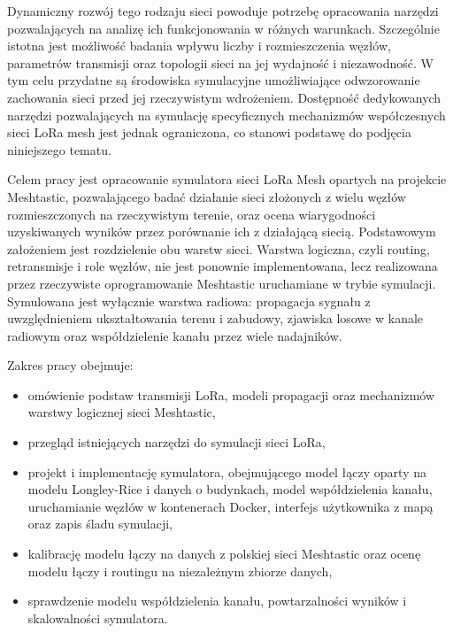 \documentclass[12pt,a4paper,twoside]{report}
\theoremstyle{definition} %
\begin{document}
Dynamiczny rozwój tego rodzaju sieci powoduje potrzebę opracowania narzędzi pozwalających na analizę ich funkcjonowania w różnych warunkach. Szczególnie istotna jest możliwość badania wpływu liczby i rozmieszczenia węzłów, parametrów transmisji oraz topologii sieci na jej wydajność i niezawodność. W tym celu przydatne są środowiska symulacyjne umożliwiające odwzorowanie zachowania sieci przed jej rzeczywistym wdrożeniem. Dostępność dedykowanych narzędzi pozwalających na symulację specyficznych mechanizmów współczesnych sieci LoRa mesh jest jednak ograniczona, co stanowi podstawę do podjęcia niniejszego tematu.

Celem pracy jest opracowanie symulatora sieci LoRa Mesh opartych na projekcie Meshtastic, pozwalającego badać działanie sieci złożonych z wielu węzłów rozmieszczonych na rzeczywistym terenie, oraz ocena wiarygodności uzyskiwanych wyników przez porównanie ich z działającą siecią. Podstawowym założeniem jest rozdzielenie obu warstw sieci. Warstwa logiczna, czyli routing, retransmisje i role węzłów, nie jest ponownie implementowana, lecz realizowana przez rzeczywiste oprogramowanie Meshtastic uruchamiane w trybie symulacji. Symulowana jest wyłącznie warstwa radiowa: propagacja sygnału z uwzględnieniem ukształtowania terenu i zabudowy, zjawiska losowe w kanale radiowym oraz współdzielenie kanału przez wiele nadajników.

Zakres pracy obejmuje:
\begin{itemize}
\item omówienie podstaw transmisji LoRa, modeli propagacji oraz mechanizmów warstwy logicznej sieci Meshtastic,
\item przegląd istniejących narzędzi do symulacji sieci LoRa,
\item projekt i implementację symulatora, obejmującego model łączy oparty na modelu Longley-Rice i danych o budynkach, model współdzielenia kanału, uruchamianie węzłów w kontenerach Docker, interfejs użytkownika z mapą oraz zapis śladu symulacji,
\item kalibrację modelu łączy na danych z polskiej sieci Meshtastic oraz ocenę modelu łączy i routingu na niezależnym zbiorze danych,
\item sprawdzenie modelu współdzielenia kanału, powtarzalności wyników i skalowalności symulatora.
\end{itemize}
\end{document}
